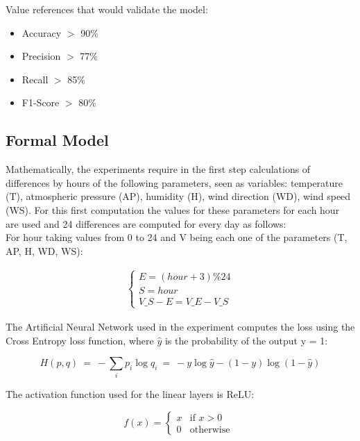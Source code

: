 \documentclass{article}
\begin{document}
Value references that would validate the model:
\begin{itemize}
    \item Accuracy $>$ 90\%
    \item Precision $>$ 77\%
    \item Recall $>$ 85\%
    \item F1-Score $>$ 80\%
\end{itemize}

\subsection{Formal Model}

Mathematically, the experiments require in the first step calculations of differences by hours of the following parameters, seen as variables: temperature (T), atmospheric pressure (AP), humidity (H), wind direction (WD), wind speed (WS). For this first computation the values for these parameters for each hour are used and 24 differences are computed for every day as follows: 
\\

For hour taking values from 0 to 24 and V being each one of the parameters (T, AP, H, WD, WS):

\begin{align}
    \begin{cases}
    E = (hour + 3) \% 24 \\
    S = hour \\
    V\_S-E = V\_E - V\_S 
\end{cases}
\end{align}

The Artificial Neural Network used in the experiment computes the loss using the Cross Entropy loss function, where \(\hat{y}\) is the probability of the output y = 1:

\begin{equation}
     H(p,q)\ =\ -\sum _{i}p_{i}\log q_{i}\ =\ -y\log {\hat {y}}-(1-y)\log(1-{\hat {y}})
\end{equation}

The activation function used for the linear layers is ReLU:

\begin{equation}
f(x) = \begin{cases}
             x  & \text{if } x > 0 \\
             0  & \text{otherwise }
       \end{cases} 
\end{equation}
\end{document}
